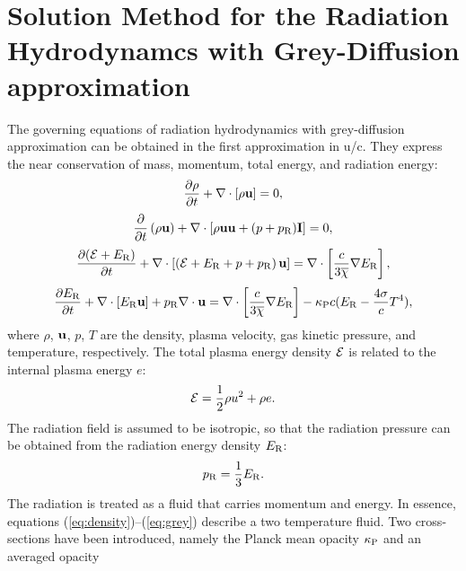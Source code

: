 \documentclass[12pt]{article}
\begin{document}
\section{Solution Method for the Radiation Hydrodynamcs with Grey-Diffusion approximation}  
The governing equations of radiation hydrodynamics with grey-diffusion 
approximation can be obtained in the first approximation in u/c. They 
express the near conservation of mass, momentum, total energy, and 
radiation energy: 
\begin{equation}\label{eq:density} \frac{\partial\rho}{\partial t} +
\nabla\cdot\left[ \rho {\bf u} \right] = 0, 
\end{equation} 
\begin{equation}   \frac{\partial}{\partial t}\left( \rho {\bf u} \right) +
 \nabla\cdot\left[ \rho{\bf u}{\bf u}     +(p+p_{\rm R}){\bf I} \right] = 0, 
\end{equation} 
\begin{equation}   \frac{\partial ({\cal E} + E_{\rm R})}{\partial t} + 
\nabla\cdot   \left[ \left( {\cal E} + E_{\rm R}+ p+p_{\rm R} \right) {\bf u} 
\right]   = \nabla\cdot\left[ \frac{c}{ 3 \overline{\chi} } \nabla E_{\rm R} 
\right], 
\end{equation}\label{eq:energy} 
\begin{equation}\label{eq:grey}   \frac{\partial E_{\rm R}}{\partial t} + 
\nabla\cdot \left[ E_{\rm R} {\bf u} \right]   + p_{\rm R}\nabla\cdot{\bf u} 
=    \nabla\cdot\left[ \frac{c}{ 3\overline{\chi} } \nabla E_{\rm R} \right]   
- \kappa_{\rm P} c (E_{\rm R} - \frac{4\sigma}{c} T^4), 
\end{equation} 
where $\rho$, ${\bf u}$, $p$, $T$ are the density, plasma velocity, gas 
kinetic pressure, and temperature, respectively. The total plasma energy 
density ${\cal E}$ is related to the internal plasma energy $e$: 
\begin{equation} 
{\cal E} = \frac{1}{2}\rho u^2 + \rho e. 
\end{equation} 
The radiation field is assumed to be isotropic, so that the radiation 
pressure can be obtained from the radiation energy density $E_{\rm R}$: 
\begin{equation} 
p_{\rm R} = \frac{1}{3}E_{\rm R}. 
\end{equation} 
The radiation is treated as a fluid that carries momentum and energy. 
In essence, equations (\ref{eq:density})--(\ref{eq:grey}) describe a two 
temperature fluid. Two cross-sections have been introduced, namely the 
Planck mean opacity $\kappa_{\rm P}$ and an averaged opacity 
\end{document}
